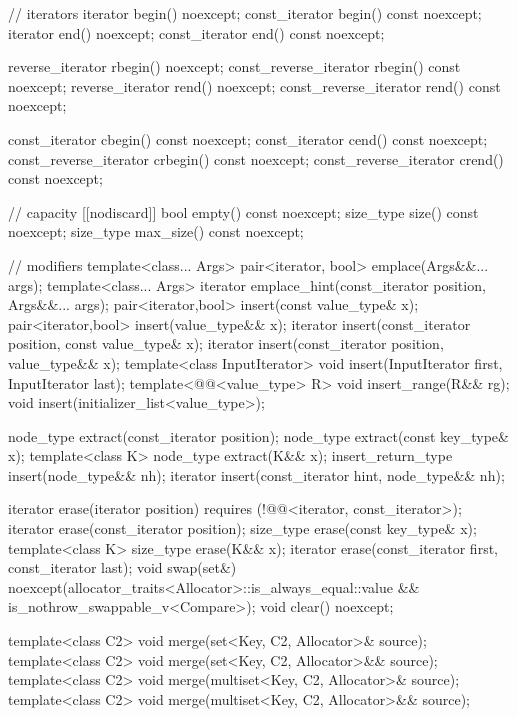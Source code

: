 \begin{codeblock}
{{    // iterators
    iterator               begin() noexcept;
    const_iterator         begin() const noexcept;
    iterator               end() noexcept;
    const_iterator         end() const noexcept;

    reverse_iterator       rbegin() noexcept;
    const_reverse_iterator rbegin() const noexcept;
    reverse_iterator       rend() noexcept;
    const_reverse_iterator rend() const noexcept;

    const_iterator         cbegin() const noexcept;
    const_iterator         cend() const noexcept;
    const_reverse_iterator crbegin() const noexcept;
    const_reverse_iterator crend() const noexcept;

    // capacity
    [[nodiscard]] bool empty() const noexcept;
    size_type size() const noexcept;
    size_type max_size() const noexcept;

    // modifiers
    template<class... Args> pair<iterator, bool> emplace(Args&&... args);
    template<class... Args> iterator emplace_hint(const_iterator position, Args&&... args);
    pair<iterator,bool> insert(const value_type& x);
    pair<iterator,bool> insert(value_type&& x);
    iterator insert(const_iterator position, const value_type& x);
    iterator insert(const_iterator position, value_type&& x);
    template<class InputIterator>
      void insert(InputIterator first, InputIterator last);
    template<@@<value_type> R>
      void insert_range(R&& rg);
    void insert(initializer_list<value_type>);

    node_type extract(const_iterator position);
    node_type extract(const key_type& x);
    template<class K> node_type extract(K&& x);
    insert_return_type insert(node_type&& nh);
    iterator           insert(const_iterator hint, node_type&& nh);

    iterator  erase(iterator position)
      requires (!@@<iterator, const_iterator>);
    iterator  erase(const_iterator position);
    size_type erase(const key_type& x);
    template<class K> size_type erase(K&& x);
    iterator  erase(const_iterator first, const_iterator last);
    void      swap(set&)
      noexcept(allocator_traits<Allocator>::is_always_equal::value &&
               is_nothrow_swappable_v<Compare>);
    void      clear() noexcept;

    template<class C2>
      void merge(set<Key, C2, Allocator>& source);
    template<class C2>
      void merge(set<Key, C2, Allocator>&& source);
    template<class C2>
      void merge(multiset<Key, C2, Allocator>& source);
    template<class C2>
      void merge(multiset<Key, C2, Allocator>&& source);

}}
\end{codeblock}
